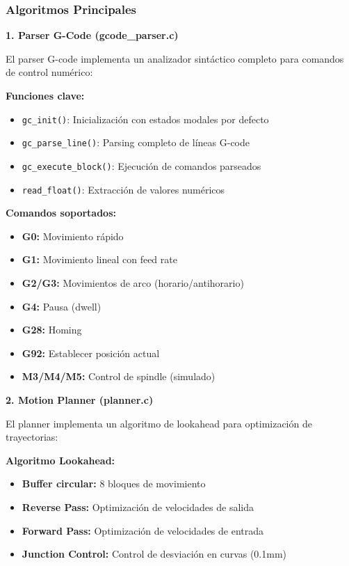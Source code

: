 \documentclass[12pt]{article}
\begin{document}
    

\subsubsection{Algoritmos Principales}

\textbf{1. Parser G-Code (gcode\_parser.c)}

El parser G-code implementa un analizador sintáctico completo para comandos de control numérico:

\textbf{Funciones clave:}
\begin{itemize}
    \item \texttt{gc\_init()}: Inicialización con estados modales por defecto
    \item \texttt{gc\_parse\_line()}: Parsing completo de líneas G-code
    \item \texttt{gc\_execute\_block()}: Ejecución de comandos parseados
    \item \texttt{read\_float()}: Extracción de valores numéricos
\end{itemize}

\textbf{Comandos soportados:}
\begin{itemize}
    \item \textbf{G0:} Movimiento rápido
    \item \textbf{G1:} Movimiento lineal con feed rate
    \item \textbf{G2/G3:} Movimientos de arco (horario/antihorario)
    \item \textbf{G4:} Pausa (dwell)
    \item \textbf{G28:} Homing
    \item \textbf{G92:} Establecer posición actual
    \item \textbf{M3/M4/M5:} Control de spindle (simulado)
\end{itemize}

\textbf{2. Motion Planner (planner.c)}

El planner implementa un algoritmo de lookahead para optimización de trayectorias:

\textbf{Algoritmo Lookahead:}
\begin{itemize}
    \item \textbf{Buffer circular:} 8 bloques de movimiento
    \item \textbf{Reverse Pass:} Optimización de velocidades de salida
    \item \textbf{Forward Pass:} Optimización de velocidades de entrada
    \item \textbf{Junction Control:} Control de desviación en curvas (0.1mm)
\end{itemize}
\end{document}
